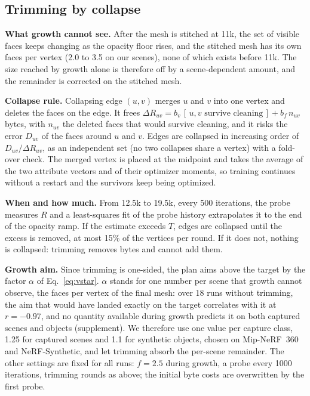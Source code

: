 \subsection{Trimming by collapse}
\label{sec:trim}
\noindent\textbf{What growth cannot see.} After the mesh is stitched at 11k, the set of visible faces keeps changing as the opacity floor rises, and the stitched mesh has its own faces per vertex (2.0 to 3.5 on our scenes), none of which exists before 11k. The size reached by growth alone is therefore off by a scene-dependent amount, and the remainder is corrected on the stitched mesh.

\noindent\textbf{Collapse rule.} Collapsing edge $(u,v)$ merges $u$ and $v$ into one vertex and deletes the faces on the edge. It frees $\Delta R_{uv} = b_v\,[\,u,v \text{ survive cleaning}\,] + b_f\, n_{uv}$ bytes, with $n_{uv}$ the deleted faces that would survive cleaning, and it risks the error $D_{uv}$ of the faces around $u$ and $v$. Edges are collapsed in increasing order of $D_{uv}/\Delta R_{uv}$, as an independent set (no two collapses share a vertex) with a fold-over check. The merged vertex is placed at the midpoint and takes the average of the two attribute vectors and of their optimizer moments, so training continues without a restart and the survivors keep being optimized.

\noindent\textbf{When and how much.} From 12.5k to 19.5k, every 500 iterations, the probe measures $R$ and a least-squares fit of the probe history extrapolates it to the end of the opacity ramp. If the estimate exceeds $T$, edges are collapsed until the excess is removed, at most 15\% of the vertices per round. If it does not, nothing is collapsed: trimming removes bytes and cannot add them.

\noindent\textbf{Growth aim.} Since trimming is one-sided, the plan aims above the target by the factor $\alpha$ of Eq.~\eqref{eq:vstar}. $\alpha$ stands for one number per scene that growth cannot observe, the faces per vertex of the final mesh: over 18 runs without trimming, the aim that would have landed exactly on the target correlates with it at $r=-0.97$, and no quantity available during growth predicts it on both captured scenes and objects (supplement). We therefore use one value per capture class, 1.25 for captured scenes and 1.1 for synthetic objects, chosen on Mip-NeRF~360 and NeRF-Synthetic, and let trimming absorb the per-scene remainder. The other settings are fixed for all runs: $f=2.5$ during growth, a probe every 1000 iterations, trimming rounds as above; the initial byte costs are overwritten by the first probe.

